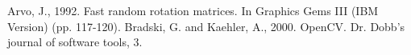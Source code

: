 \documentclass[12pt]{article}
\begin{document}

\begin{thebibliography}{9}
Arvo, J., 1992. Fast random rotation matrices. In Graphics Gems III (IBM Version) (pp. 117-120).
Bradski, G. and Kaehler, A., 2000. OpenCV. Dr. Dobb’s journal of software tools, 3.
\end{thebibliography}
\end{document}
